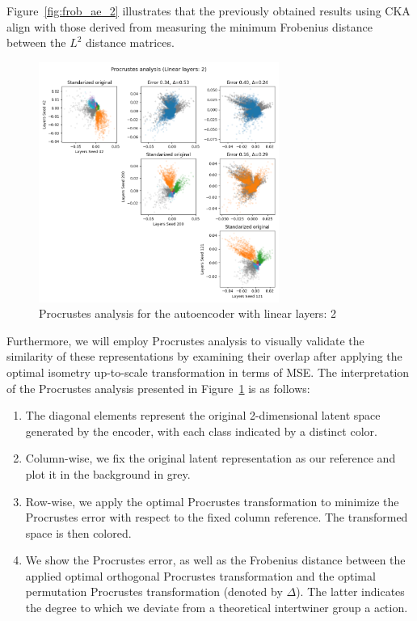 \documentclass[../main.tex]{subfiles}
\begin{document}
Figure~\ref{fig:frob_ae_2} illustrates that the previously obtained results using CKA align with those derived from measuring the minimum Frobenius distance between the $L^2$ distance matrices.

\begin{figure}[ht!]
    \centering
    \includegraphics[width=0.7\textwidth]{figures/rs/sim_ae/procrustes_2__42_200_121.png} 
    \caption{Procrustes analysis for the autoencoder with linear layers: 2}
    \label{fig:proc_ae_2}
\end{figure}


Furthermore, we will employ Procrustes analysis to visually validate the similarity of these representations by examining their overlap after applying the optimal isometry up-to-scale transformation in terms of MSE. The interpretation of the Procrustes analysis presented in Figure~\ref{fig:proc_ae_2} is as follows:
\begin{enumerate}
    \item The diagonal elements represent the original 2-dimensional latent space generated by the encoder, with each class indicated by a distinct color.
    \item Column-wise, we fix the original latent representation as our reference and plot it in the background in grey.
    \item Row-wise, we apply the optimal Procrustes transformation to minimize the Procrustes error with respect to the fixed column reference. The transformed space is then colored.
    \item We show the Procrustes error, as well as the Frobenius distance between the applied optimal orthogonal Procrustes transformation and the optimal permutation Procrustes transformation (denoted by $\Delta$). The latter indicates the degree to which we deviate from a theoretical intertwiner group a action.
\end{enumerate}
\end{document}
